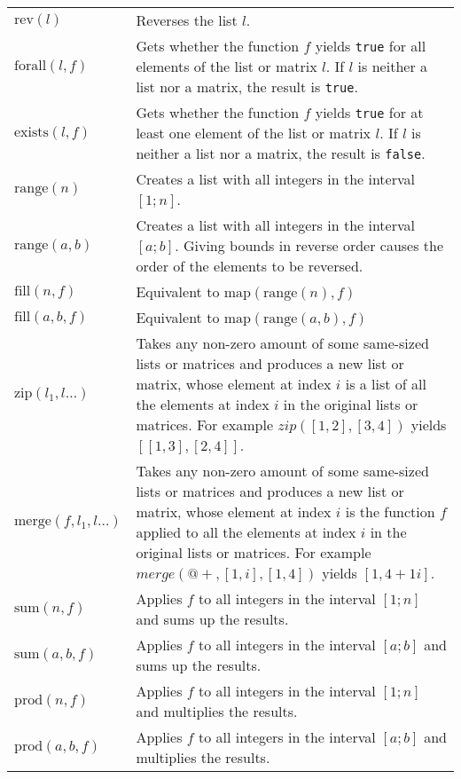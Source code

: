 \documentclass[10pt]{article}
\newcommand{\tabgap}{\vspace{3mm}\\}
\begin{document}
\begin{longtable}{p{}p{}}
        $ \mathrm{rev}(l) $                        & Reverses the list $ l $. \\
        $ \mathrm{forall}(l, f) $                  & Gets whether the function $ f $ yields \verb|true| for all elements of the list or matrix $ l $. If $ l $ is neither a list nor a matrix, the result is \verb|true|.  \\
        $ \mathrm{exists}(l, f) $                  & Gets whether the function $ f $ yields \verb|true| for at least one element of the list or matrix $ l $. If $ l $ is neither a list nor a matrix, the result is \verb|false|. \tabgap
        $ \mathrm{range}(n) $                      & Creates a list with all integers in the interval $ [1;n] $. \\
        $ \mathrm{range}(a, b) $                   & Creates a list with all integers in the interval $ [a;b] $. Giving bounds in reverse order causes the order of the elements to be reversed. \\
        $ \mathrm{fill}(n, f) $                    & Equivalent to $ \mathrm{map}(\mathrm{range}(n), f) $ \\
        $ \mathrm{fill}(a, b, f) $                 & Equivalent to $ \mathrm{map}(\mathrm{range}(a, b), f) $ \tabgap
        $ \mathrm{zip}(l_1, l\dots) $              & Takes any non-zero amount of some same-sized lists or matrices and produces a new list or matrix, whose element at index $ i $ is a list of all the elements at index $ i $ in the original lists or matrices. For example $ zip([1,2],[3,4]) $ yields $ [[1,3],[2,4]] $. \\
        $ \mathrm{merge}(f, l_1, l\dots) $         & Takes any non-zero amount of some same-sized lists or matrices and produces a new list or matrix, whose element at index $ i $ is the function $ f $ applied to all the elements at index $ i $ in the original lists or matrices. For example $ merge({@+},[1,i],[1,4]) $ yields $ [1, 4 + 1i] $. \tabgap
        $ \mathrm{sum}(n, f) $                     & Applies $ f $ to all integers in the interval $ [1;n] $ and sums up the results. \\
        $ \mathrm{sum}(a, b, f) $                  & Applies $ f $ to all integers in the interval $ [a;b] $ and sums up the results. \\
        $ \mathrm{prod}(n, f) $                    & Applies $ f $ to all integers in the interval $ [1;n] $ and multiplies the results. \\
        $ \mathrm{prod}(a, b, f) $                 & Applies $ f $ to all integers in the interval $ [a;b] $ and multiplies the results. \\

\end{longtable}
\end{document}
